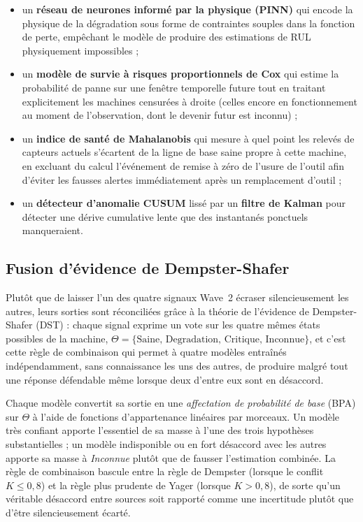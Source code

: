\begin{itemize}
\item un \textbf{réseau de neurones informé par la physique (PINN)} qui encode la physique de la dégradation sous forme de contraintes souples dans la fonction de perte, empêchant le modèle de produire des estimations de RUL physiquement impossibles ;
\item un \textbf{modèle de survie à risques proportionnels de Cox} qui estime la probabilité de panne sur une fenêtre temporelle future tout en traitant explicitement les machines censurées à droite (celles encore en fonctionnement au moment de l'observation, dont le devenir futur est inconnu) ;
\item un \textbf{indice de santé de Mahalanobis} qui mesure à quel point les relevés de capteurs actuels s'écartent de la ligne de base saine propre à cette machine, en excluant du calcul l'événement de remise à zéro de l'usure de l'outil afin d'éviter les fausses alertes immédiatement après un remplacement d'outil ;
\item un \textbf{détecteur d'anomalie CUSUM} lissé par un \textbf{filtre de Kalman} pour détecter une dérive cumulative lente que des instantanés ponctuels manqueraient.
\end{itemize}

\subsection{Fusion d'évidence de Dempster-Shafer}

Plutôt que de laisser l'un des quatre signaux Wave~2 écraser silencieusement les autres, leurs sorties sont réconciliées grâce à la théorie de l'évidence de Dempster-Shafer (DST) : chaque signal exprime un vote sur les quatre mêmes états possibles de la machine, $\Theta = \{\mathrm{Saine},\, \mathrm{Degradation},\, \mathrm{Critique},\, \mathrm{Inconnue}\}$, et c'est cette règle de combinaison qui permet à quatre modèles entraînés indépendamment, sans connaissance les uns des autres, de produire malgré tout une réponse défendable même lorsque deux d'entre eux sont en désaccord.

Chaque modèle convertit sa sortie en une \emph{affectation de probabilité de base} (BPA) sur $\Theta$ à l'aide de fonctions d'appartenance linéaires par morceaux. Un modèle très confiant apporte l'essentiel de sa masse à l'une des trois hypothèses substantielles ; un modèle indisponible ou en fort désaccord avec les autres apporte sa masse à \textit{Inconnue} plutôt que de fausser l'estimation combinée. La règle de combinaison bascule entre la règle de Dempster (lorsque le conflit $K \leq 0{,}8$) et la règle plus prudente de Yager (lorsque $K > 0{,}8$), de sorte qu'un véritable désaccord entre sources soit rapporté comme une incertitude plutôt que d'être silencieusement écarté.

